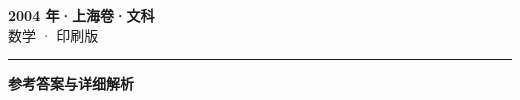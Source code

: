 \documentclass[zihao=5, a4paper]{ctexart}
\begin{document}
\begin{center}
  {\Large\bfseries 2004 年·上海卷·文科}\\[4pt]
  {\large 数学 · 印刷版}
\end{center}
\medskip
{}

\par\bigskip\hrule\bigskip
{}
\begin{center}{\large\bfseries 参考答案与详细解析}\end{center}
\smallskip

\end{document}
